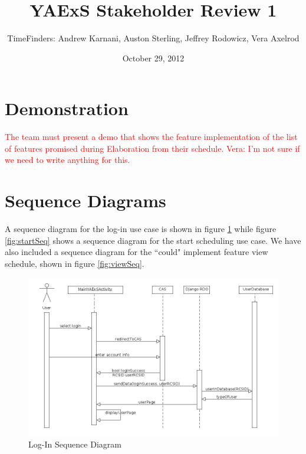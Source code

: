 \documentclass[11pt]{article}
\title{\bf YAExS Stakeholder Review 1}
\author{TimeFinders: Andrew Karnani, Auston Sterling, Jeffrey Rodowicz, Vera Axelrod}
\date{October 29, 2012}
\begin{document}
\maketitle

\section*{Demonstration} %
\textcolor{red}{
The team must present a demo that shows the feature implementation of the list of features promised during Elaboration from their schedule.
Vera: I'm not sure if we need to write anything for this.}



\section*{Sequence Diagrams} %

A sequence diagram for the log-in use case is shown in figure \ref{fig:logInSeq}
 while figure \ref{fig:startSeq} shows a sequence diagram for the start scheduling 
use case.  We have also included a sequence diagram for the ``could" implement feature view schedule, shown in figure \ref{fig:viewSeq}. 

\begin{figure}
	\centering
		\includegraphics[width = \textwidth]{logInSequence.png}
	\caption{Log-In Sequence Diagram}
	\label{fig:logInSeq}
\end{figure}
\end{document}
